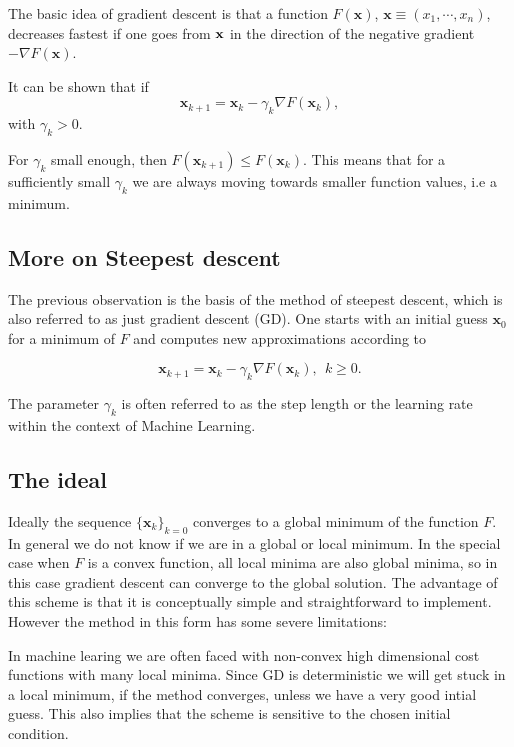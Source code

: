 \documentclass[%
oneside,                 %
final,                   %
10pt]{article}
\begin{document}
The basic idea of gradient descent is
that a function $F(\mathbf{x})$, 
$\mathbf{x} \equiv (x_1,\cdots,x_n)$, decreases fastest if one goes from $\bf {x}$ in the
direction of the negative gradient $-\nabla F(\mathbf{x})$.

It can be shown that if 
\[
\mathbf{x}_{k+1} = \mathbf{x}_k - \gamma_k \nabla F(\mathbf{x}_k),
\]
with $\gamma_k > 0$.

For $\gamma_k$ small enough, then $F(\mathbf{x}_{k+1}) \leq
F(\mathbf{x}_k)$. This means that for a sufficiently small $\gamma_k$
we are always moving towards smaller function values, i.e a minimum.

\subsection{More on Steepest descent}

The previous observation is the basis of the method of steepest
descent, which is also referred to as just gradient descent (GD). One
starts with an initial guess $\mathbf{x}_0$ for a minimum of $F$ and
computes new approximations according to

\[
\mathbf{x}_{k+1} = \mathbf{x}_k - \gamma_k \nabla F(\mathbf{x}_k), \ \ k \geq 0.
\]

The parameter $\gamma_k$ is often referred to as the step length or
the learning rate within the context of Machine Learning.

\subsection{The ideal}

Ideally the sequence $\{\mathbf{x}_k \}_{k=0}$ converges to a global
minimum of the function $F$. In general we do not know if we are in a
global or local minimum. In the special case when $F$ is a convex
function, all local minima are also global minima, so in this case
gradient descent can converge to the global solution. The advantage of
this scheme is that it is conceptually simple and straightforward to
implement. However the method in this form has some severe
limitations:

In machine learing we are often faced with non-convex high dimensional
cost functions with many local minima. Since GD is deterministic we
will get stuck in a local minimum, if the method converges, unless we
have a very good intial guess. This also implies that the scheme is
sensitive to the chosen initial condition.
\end{document}

